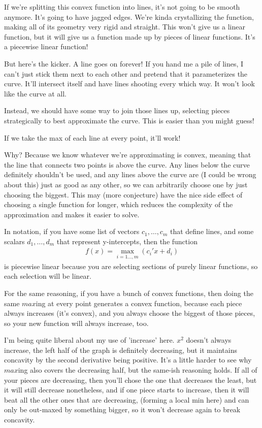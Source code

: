 \documentclass[12pt, letterpaper]{article}
\begin{document}
If we're splitting this convex function into lines, it's not going to be smooth anymore.
It's going to have jagged edges. We're kinda crystallizing the function, making all of its geometry
very rigid and straight. This won't give us a linear function, but it will give us a function
made up by pieces of linear functions. It's a piecewise linear function!

But here's the kicker. A line goes on forever! If you hand me a pile of lines, I can't
just stick them next to each other and pretend that it parameterizes the curve. 
It'll intersect itself and have lines shooting every which way. 
It won't look like the curve at all.

Instead, we should have some way to join those lines up, selecting pieces strategically to best approximate the curve.
This is easier than you might guess!

If we take the max of each line at every point, it'll work!

Why? Because we know whatever we're approximating is convex, meaning that the line that connects two points
is above the curve. Any lines below the curve definitely shouldn't be used, and any lines above the curve
are (I could be wrong about this) just as good as any other, so we can arbitrarily choose one by just choosing
the biggest. This may (more conjecture) have the nice side effect of choosing a single function for longer, which
reduces the complexity of the approximation and makes it easier to solve.

In notation, if you have some list of vectors $c_1, \dots, c_m$ that define lines, and some scalars $d_1, \dots, d_m$
that represent y-intercepts, then the function 
\begin{gather*}
    f(x) = \max_{i=1\dots,m} (c_i'x + d_i)
\end{gather*}
is piecewise linear because you are selecting sections of purely linear functions, so each selection will be linear.

For the same reasoning, if you have a bunch of convex functions, then doing the same $max$ing at every point
generates a convex function, because each piece always increases (it's convex), and you always choose the biggest of those pieces,
so your new function will always increase, too.

I'm being quite liberal about my use of 'increase' here. $x^2$ doesn't always increase, the left half of the graph is
definitely decreasing, but it maintains concavity by the second derivative being positive. It's a little 
harder to see why $max$ing also covers the decreasing half, but the same-ish reasoning holds.
If all of your pieces are decreasing, then you'll chose the one that decreases the least, but it will still decrease
nonetheless, and if one piece starts to increase, then it will beat all the other ones that are decreasing,
(forming a local min here) and can only be out-maxed by something bigger, so it won't decrease again to break concavity.
\end{document}
